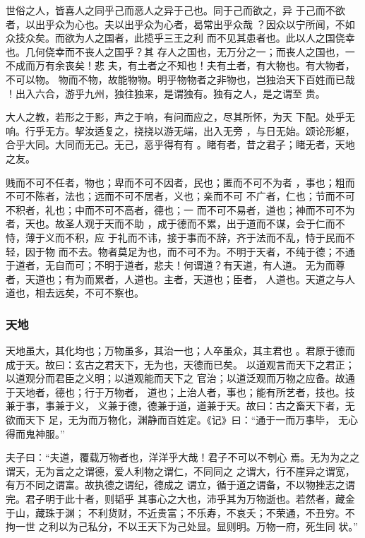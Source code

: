 \documentclass[]{article}
\begin{document}
世俗之人，皆喜人之同乎己而恶人之异于己也。同于己而欲之，异
于己而不欲者，以出乎众为心也。夫以出乎众为心者，曷常出乎众哉
？因众以宁所闻，不如众技众矣。而欲为人之国者，此揽乎三王之利
而不见其患者也。此以人之国侥幸也。几何侥幸而不丧人之国乎？其
存人之国也，无万分之一；而丧人之国也，一不成而万有余丧矣！悲
夫，有土者之不知也！夫有土者，有大物也。有大物者，不可以物。
物而不物，故能物物。明乎物物者之非物也，岂独治天下百姓而已哉
！出入六合，游乎九州，独往独来，是谓独有。独有之人，是之谓至 贵。

大人之教，若形之于影，声之于响，有问而应之，尽其所怀，为天
下配。处乎无响。行乎无方。挈汝适复之，挠挠以游无端，出入无旁
，与日无始。颂论形躯，合乎大同。大同而无己。无己，恶乎得有有
。睹有者，昔之君子；睹无者，天地之友。

贱而不可不任者，物也；卑而不可不因者，民也；匿而不可不为者
，事也；粗而不可不陈者，法也；远而不可不居者，义也；亲而不可
不广者，仁也；节而不可不积者，礼也；中而不可不高者，德也；一
而不可不易者，道也；神而不可不为者，天也。故圣人观于天而不助
，成于德而不累，出于道而不谋，会于仁而不恃，薄于义而不积，应
于礼而不讳，接于事而不辞，齐于法而不乱，恃于民而不轻，因于物
而不去。物者莫足为也，而不可不为。不明于天者，不纯于德；不通
于道者，无自而可；不明于道者，悲夫！何谓道？有天道，有人道。
无为而尊者，天道也；有为而累者，人道也。主者，天道也；臣者，
人道也。天道之与人道也，相去远矣，不可不察也。

\hypertarget{header-n727}{%
\subsubsection{天地}\label{header-n727}}

天地虽大，其化均也；万物虽多，其治一也；人卒虽众，其主君也
。君原于德而成于天。故曰：玄古之君天下，无为也，天德而已矣。
以道观言而天下之君正；以道观分而君臣之义明；以道观能而天下之
官治；以道泛观而万物之应备。故通于天地者，德也；行于万物者，
道也；上治人者，事也；能有所艺者，技也。技兼于事，事兼于义，
义兼于德，德兼于道，道兼于天。故曰：古之畜天下者，无欲而天下
足，无为而万物化，渊静而百姓定。《记》曰：``通于一而万事毕，
无心得而鬼神服。''

夫子曰：``夫道，覆载万物者也，洋洋乎大哉！君子不可以不刳心
焉。无为为之之谓天，无为言之之谓德，爱人利物之谓仁，不同同之
之谓大，行不崖异之谓宽，有万不同之谓富。故执德之谓纪，德成之
谓立，循于道之谓备，不以物挫志之谓完。君子明于此十者，则韬乎
其事心之大也，沛乎其为万物逝也。若然者，藏金于山，藏珠于渊；
不利货财，不近贵富；不乐寿，不哀夭；不荣通，不丑穷。不拘一世
之利以为己私分，不以王天下为己处显。显则明。万物一府，死生同 状。''
\end{document}
